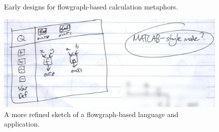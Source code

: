\documentclass[12pt,twoside,notitlepage,xetex]{report}
\begin{document}
\begin{center}
\begin{figure}[H]
\begin{center}
\end{center}
\caption{Early designs for flowgraph-based calculation metaphors.}
\label{fig:Flows1}
\end{figure}
\end{center}

\begin{center}
\begin{figure}[H]
\begin{center}
\includegraphics[width=\textwidth]{figs/mockups/sketches/11/11jii.jpg}
\end{center}
\caption{A more refined sketch of a flowgraph-based language and application.}
\label{fig:Flows2}
\end{figure}
\end{center}
\end{document}
